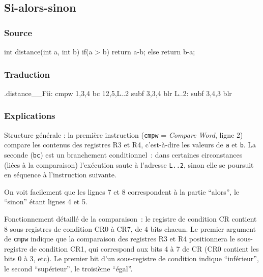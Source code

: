 \documentclass[10pt,twoside,a4paper]{article}
\begin{document}
\begin{multicols}{2}
\subsection{Si-alors-sinon}

\subsubsection{Source}
\begin{center}
\begin{boxedverbatim}
int distance(int a, int b)
{
  if(a > b)
    return a-b;
  else 
    return b-a;
}
\end{boxedverbatim}
\end{center}

\subsubsection{Traduction}
\begin{center}
\begin{listing}{1}
.distance__Fii:
        cmpw 1,3,4
        bc 12,5,L..2
        subf 3,3,4
        blr
L..2:
        subf 3,4,3
        blr
\end{listing}
\end{center}

\subsubsection{Explications}

Structure générale : la première instruction (\texttt{cmpw} =
\emph{Compare Word}, ligne 2) compare les contenus des registres R3 et
R4, c'est-à-dire les valeurs de \texttt{a} et \texttt{b}.  La seconde
(\texttt{bc}) est un branchement conditionnel~: dans certaines
circonstances (liées à la comparaison) l'exécution saute à l'adresse
\texttt{L..2}, sinon elle se poursuit en séquence à l'instruction
suivante.
 
On voit facilement que les lignes 7 et 8 correspondent à la partie ``alors'',
le ``sinon'' étant lignes 4 et 5.

Fonctionnement détaillé de la comparaison~: le registre de condition CR
contient 8 sous-registres de condition CR0 à CR7, de 4 bits chacun.
Le premier argument de \texttt{cmpw} indique que la comparaison des
registres R3 et R4 positionnera le sous-registre de condition CR1, qui
correspond aux bits 4 à 7 de CR (CR0 contient les bits 0 à 3, etc).
Le premier bit d'un sous-registre de condition indique ``inférieur'',
le second ``supérieur'', le troisième ``égal''. 


\end{multicols}
\end{document}

